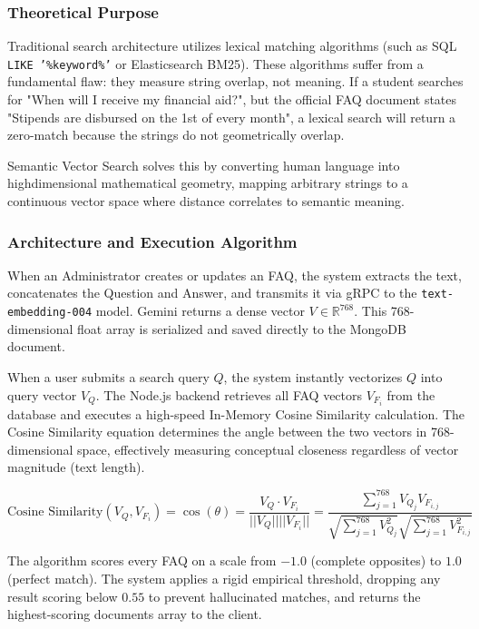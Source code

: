 \documentclass[12pt,a4paper]{article}
\begin{document}
\subsubsection{Theoretical Purpose}
Traditional search architecture utilizes lexical matching algorithms (such as SQL \texttt{LIKE '\%keyword\%'} or Elasticsearch BM25). These algorithms suffer from a fundamental flaw: they measure string overlap, not meaning. If a student searches for "When will I receive my financial aid?", but the official FAQ document states "Stipends are disbursed on the 1st of every month", a lexical search will return a zero-match because the strings do not geometrically overlap. 

Semantic Vector Search solves this by converting human language into high\-dimen\-sional mathematical geometry, mapping arbitrary strings to a continuous vector space where distance correlates to semantic meaning.

\subsubsection{Architecture and Execution Algorithm}
When an Administrator creates or updates an FAQ, the system extracts the text, concatenates the Question and Answer, and transmits it via gRPC to the \texttt{text-embedding-004} model. Gemini returns a dense vector $V \in \mathbb{R}^{768}$. This 768-dimensional float array is serialized and saved directly to the MongoDB document.

When a user submits a search query $Q$, the system instantly vectorizes $Q$ into query vector $V_Q$. The Node.js backend retrieves all FAQ vectors $V_{F_i}$ from the database and executes a high-speed In-Memory Cosine Similarity calculation. The Cosine Similarity equation determines the angle between the two vectors in 768-dimensional space, effectively measuring conceptual closeness regardless of vector magnitude (text length).

\begin{equation}
    \text{Cosine Similarity}(V_Q, V_{F_i}) = \cos(\theta) = \frac{V_Q \cdot V_{F_i}}{||V_Q|| ||V_{F_i}||} = \frac{\sum_{j=1}^{768} V_{Q_j} V_{F_{i,j}}}{\sqrt{\sum_{j=1}^{768} V_{Q_j}^2} \sqrt{\sum_{j=1}^{768} V_{F_{i,j}}^2}}
\end{equation}

The algorithm scores every FAQ on a scale from $-1.0$ (complete opposites) to $1.0$ (perfect match). The system applies a rigid empirical threshold, dropping any result scoring below $0.55$ to prevent hallucinated matches, and returns the highest-scoring documents array to the client.
\end{document}
